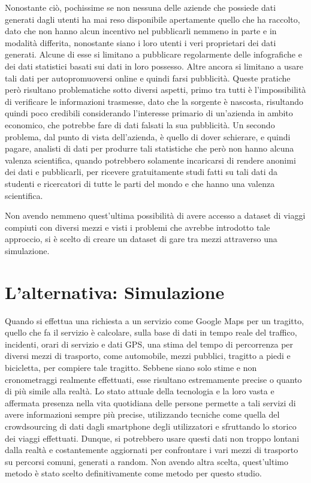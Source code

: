 Nonostante ciò, pochissime se non nessuna delle aziende che possiede dati generati dagli utenti ha mai reso disponibile apertamente quello che ha raccolto, dato che non hanno alcun incentivo nel pubblicarli nemmeno in parte e in modalità differita, nonostante siano i loro utenti i veri proprietari dei dati generati. Alcune di esse si limitano a pubblicare regolarmente delle infografiche e dei dati statistici basati sui dati in loro possesso. Altre ancora si limitano a usare tali dati per autopromuoversi online e quindi farsi pubblicità. Queste pratiche però risultano problematiche sotto diversi aspetti, primo tra tutti è l'impossibilità di verificare le informazioni trasmesse, dato che la sorgente è nascosta, risultando quindi poco credibili considerando l'interesse primario di un'azienda in ambito economico, che potrebbe fare di dati falsati la sua pubblicità. Un secondo problema, dal punto di vista dell'azienda, è quello di dover schierare, e quindi pagare, analisti di dati per produrre tali statistiche che però non hanno alcuna valenza scientifica, quando potrebbero solamente incaricarsi di rendere anonimi dei dati e pubblicarli, per ricevere gratuitamente studi fatti su tali dati da studenti e ricercatori di tutte le parti del mondo e che hanno una valenza scientifica.

Non avendo nemmeno quest'ultima possibilità di avere accesso a dataset di viaggi compiuti con diversi mezzi e visti i problemi che avrebbe introdotto tale approccio, si è scelto di creare un dataset di gare tra mezzi attraverso una simulazione.

\section{L'alternativa: Simulazione}

Quando si effettua una richiesta a un servizio come Google Maps per un tragitto, quello che fa il servizio è calcolare, sulla base di dati in tempo reale del traffico, incidenti, orari di servizio e dati GPS, una stima del tempo di percorrenza per diversi mezzi di trasporto, come automobile, mezzi pubblici, tragitto a piedi e bicicletta, per compiere tale tragitto. Sebbene siano solo stime e non cronometraggi realmente effettuati, esse risultano estremamente precise o quanto di più simile alla realtà. Lo stato attuale della tecnologia e la loro vasta e affermata presenza nella vita quotidiana delle persone permette a tali servizi di avere informazioni sempre più precise, utilizzando tecniche come quella del crowdsourcing di dati dagli smartphone degli utilizzatori e sfruttando lo storico dei viaggi effettuati. Dunque, si potrebbero usare questi dati non troppo lontani dalla realtà e costantemente aggiornati per confrontare i vari mezzi di trasporto su percorsi comuni, generati a random. Non avendo altra scelta, quest'ultimo metodo è stato scelto definitivamente come metodo per questo studio.

